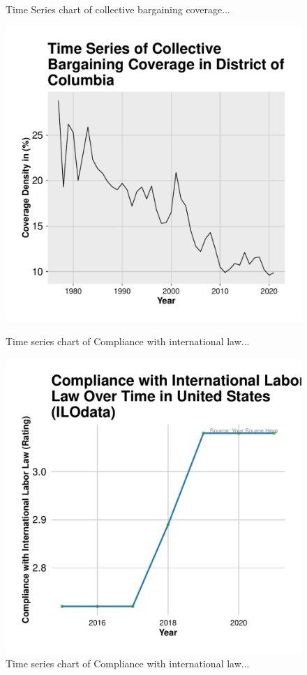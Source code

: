\documentclass[11pt]{article}\usepackage[]{graphicx}\usepackage[]{xcolor}
\newenvironment{knitrout}{}{} %
\begin{document}
\begin{figure}[h!]
\begin{minipage}{0.48\linewidth}
\begin{knitrout}
{}


\end{knitrout}
    \caption{Time Series chart of collective bargaining coverage...}
  \end{minipage}
 \begin{minipage}{0.48\linewidth}
\begin{knitrout}
\color{fgcolor}

{\centering \includegraphics[width=0.7\linewidth]{figure/United_States_West_Virginia-1} 

}


\end{knitrout}
    \caption{Time series chart of Compliance with international law...}
 \end{minipage}
\hfill
  \begin{minipage}{0.48\linewidth}
\begin{knitrout}
\color{fgcolor}

{\centering \includegraphics[width=0.7\linewidth]{figure/United_States_labor_compliance-1} 

}


\end{knitrout}
    \caption{Time series chart of Compliance with international law...}
  \end{minipage}
\end{figure}
\end{document}
